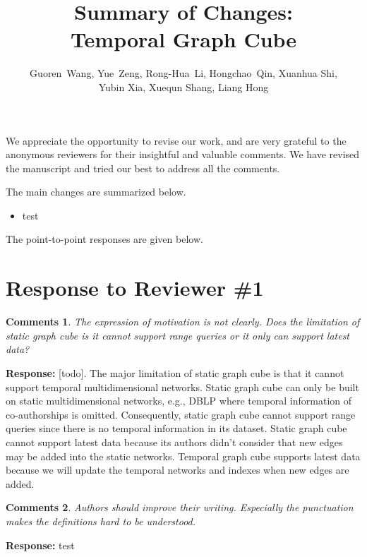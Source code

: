 \documentclass{article}
\title{Summary of Changes: \\Temporal Graph Cube}
\author{Guoren~Wang,
	Yue~Zeng,
	Rong-Hua~Li,
	Hongchao~Qin,
	Xuanhua Shi,\\
	Yubin Xia, 
	Xuequn Shang, 
	Liang Hong
}
\date{}
\newtheorem{Comments}{\textbf{Comments}}
\begin{document}
\maketitle

We appreciate the opportunity to revise our work, and are very grateful to the anonymous reviewers for their insightful and valuable comments. We have revised the manuscript and tried our best to address all the comments. 

The main changes are summarized below.
\begin{itemize}

\item test

\end{itemize}

The point-to-point responses are given below.
	
\section{Response to Reviewer \#1}
\begin{Comments}
The expression of motivation is not clearly. Does the limitation of static graph cube is it cannot support range queries or it only can support latest data?
\end{Comments}
\noindent \textbf{Response:} [todo]. The major limitation of static graph cube is that it cannot support temporal multidimensional networks. Static graph cube can only be built on static multidimensional networks, e.g., DBLP where temporal information of co-authorships is omitted. Consequently, static graph cube cannot support range queries since there is no temporal information in its dataset. Static graph cube cannot support latest data because its authors didn't consider that new edges may be added into the static networks. Temporal graph cube supports latest data because we will update the temporal networks and indexes when new edges are added.

\begin{Comments}
Authors should improve their writing. Especially the punctuation makes the definitions hard to be understood.
\end{Comments}
\noindent \textbf{Response:} test
\end{document}

